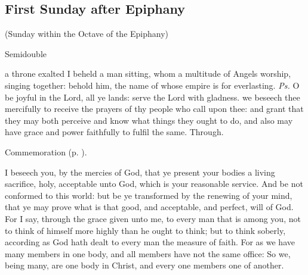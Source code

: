 \clearpage
\subsection{First Sunday after Epiphany}

\centerline{\small{(Sunday within the Octave of the Epiphany)}}

\fancyhead[RE,LO]{}
\begin{inhead}
{Semidouble}
\end{inhead}


\introit
{} a throne exalted I beheld a man sitting, whom a multitude of Angels worship, singing together: behold him, the name of whose empire is for everlasting. \textit{Ps.} O be joyful in the Lord, all ye lands: serve the Lord with gladness.
\collect
 we beseech thee mercifully to receive the prayers of thy people who call upon thee: and grant that they may both perceive and know what things they ought to do, and also may have grace and power faithfully to fulfil the same. Through.

\begin{rubric}
    Commemoration  (p. \pageref{EpiphanyMassCollect}).
\end{rubric}

 I beseech you, by the mercies of God, that ye present your bodies a living sacrifice, holy, acceptable unto God, which is your reasonable service. And be not conformed to this world: but be ye transformed by the renewing of your mind, that ye may prove what is that good, and acceptable, and perfect, will of God. For I say, through the grace given unto me, to every man that is among you, not to think of himself more highly than he ought to think; but to think soberly, according as God hath dealt to every man the measure of faith. For as we have many members in one body, and all members have not the same office: So we, being many, are one body in Christ, and every one members one of another.


